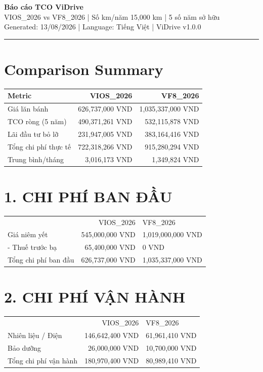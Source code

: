 \documentclass[11pt,a4paper]{article}
\begin{document}
\thispagestyle{empty}

\begin{center}
    {\LARGE \textbf{\color{ViDriveBlue} Báo cáo TCO ViDrive}}\\[0.3cm]
    {\Large VIOS\_2026 vs VF8\_2026 | Số km/năm 15,000 km | 5 số năm sở hữu}\\[0.2cm]
    {\normalsize Generated: 13/08/2026 | Language: Tiếng Việt | ViDrive v1.0.0}
\end{center}
\vspace{0.5cm}
\hrule
\vspace{0.5cm}
\section*{Comparison Summary}
\begin{tabular}{l r r}
\toprule
Metric & VIOS\_2026 & VF8\_2026 \\ \midrule
Giá lăn bánh & 626,737,000 VND & 1,035,337,000 VND \\
TCO ròng (5 năm) & 490,371,261 VND & 532,115,878 VND \\
Lãi đầu tư bỏ lỡ & 231,947,005 VND & 383,164,416 VND \\
Tổng chi phí thực tế & 722,318,266 VND & 915,280,294 VND \\
Trung bình/tháng & 3,016,173 VND & 1,349,824 VND \\
\bottomrule
\end{tabular}
\vspace{0.5cm}\section*{1. CHI PHÍ BAN ĐẦU}
\begin{tabular}{l r}
\toprule
 & VIOS\_2026 & VF8\_2026 \\
Giá niêm yết & 545,000,000 VND & 1,019,000,000 VND \\
 - Thuế trước bạ & 65,400,000 VND & 0 VND \\
Tổng chi phí ban đầu & 626,737,000 VND & 1,035,337,000 VND \\
\bottomrule
\end{tabular}
\vspace{0.3cm}\section*{2. CHI PHÍ VẬN HÀNH}
\begin{tabular}{l r}
\toprule
 & VIOS\_2026 & VF8\_2026 \\
Nhiên liệu / Điện & 146,642,400 VND & 61,961,410 VND \\
Bảo dưỡng & 26,000,000 VND & 10,700,000 VND \\
Tổng chi phí vận hành & 180,970,400 VND & 80,989,410 VND \\
\bottomrule
\end{tabular}
\end{document}
